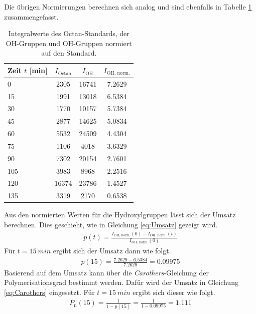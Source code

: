 \documentclass[12pt, bibliography=totocnumbered]{scrartcl}
\begin{document}
Die übrigen Normierungen berechnen sich analog und sind ebenfalls in Tabelle \ref{tab:NMR_Daten} zusammengefasst.
\begin{table}[H]
    \centering
    \caption{Integralwerte des Octan-Standards, der OH-Gruppen und OH-Gruppen normiert auf den Standard.}
    \begin{tabular}{lccc}
        \hline
        Zeit $t$ [min] & $I_\text{Octan}$ & $I_\text{OH}$ & $I_\text{OH, norm.}$ \\
        \hline\hline
        \num{0}   & \num{2305}  & \num{16741} & \num{7.2629} \\
        \num{15}  & \num{1991}  & \num{13018} & \num{6.5384} \\
        \num{30}  & \num{1770}  & \num{10157} & \num{5.7384} \\
        \num{45}  & \num{2877}  & \num{14625} & \num{5.0834} \\
        \num{60}  & \num{5532}  & \num{24509} & \num{4.4304} \\
        \num{75}  & \num{1106}  & \num{4018}  & \num{3.6329} \\
        \num{90}  & \num{7302}  & \num{20154} & \num{2.7601} \\
        \num{105} & \num{3983}  & \num{8968}  & \num{2.2516} \\
        \num{120} & \num{16374} & \num{23786} & \num{1.4527} \\
        \num{135} & \num{3319}  & \num{2170}  & \num{0.6538} \\
        \hline 
    \end{tabular}
    \label{tab:NMR_Daten}
\end{table}
Aus den normierten Werten für die Hydroxylgruppen lässt sich der Umsatz berechnen. Dies geschieht, wie in Gleichung \ref{eq:Umsatz} gezeigt wird.
\begin{align}
    p(t) = \frac{I_\text{OH, norm.}(0)-I_\text{OH, norm.}(t)}{I_\text{OH, norm.}(0)}
    \label{eq:Umsatz}
\end{align}
Für $t = \SI{15}{min}$ ergibt sich der Umsatz dann wie folgt.
\begin{align}
    p(15) = \frac{\num{7.2629}-\num{6.5384}}{\num{7.2629}} = \num{0.09975}
\end{align}
Basierend auf dem Umsatz kann über die \textit{Carothers}-Gleichung der Polymerisationsgrad bestimmt werden. Dafür wird der Umsatz in Gleichung \ref{eq:Carothers} eingesetzt. Für $t=\SI{15}{min}$ ergibt sich dieser wie folgt. 
\begin{align*}
    P_\text{n}(15)= \frac{1}{1-p(15)} = \frac{1}{1-\num{0.09975}} = \num{1.111}
\end{align*}
\end{document}
